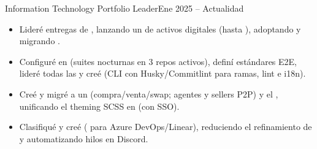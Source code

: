 


\begin{TimelineRole}{Information Technology Portfolio Leader}{Ene 2025 – Actualidad}
    \begin{itemize}
        \item Lideré entregas de , lanzando un  de activos digitales (hasta ), adoptando  y migrando .
        \item Configuré  en  (suites nocturnas en 3 repos activos), definí estándares E2E, lideré todas las  y creé \texttt{} (CLI con Husky/Commitlint para ramas, lint e i18n).
        \item Creé y migré a  un  (compra/venta/swap; agentes y sellers P2P) y el , unificando el theming SCSS en  (con SSO).
        \item Clasifiqué  y creé \texttt{} ( para Azure DevOps/Linear), reduciendo el refinamiento de  y automatizando hilos en Discord.
    \end{itemize}
\end{TimelineRole}

